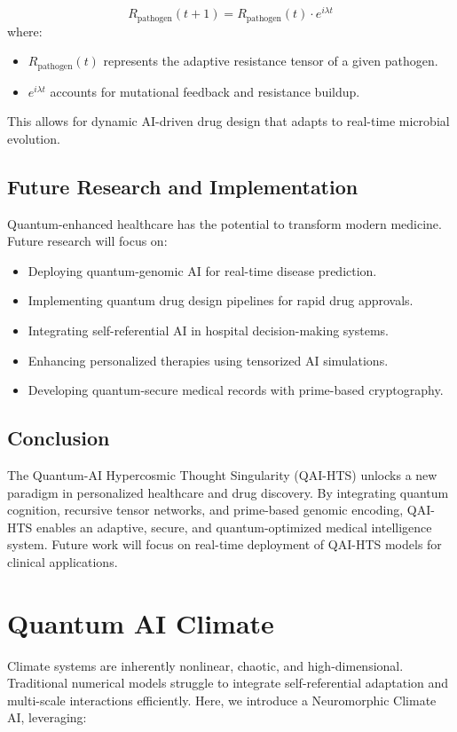 \documentclass{article}
\theoremstyle{plain}
\begin{document}
\begin{itemize}
\begin{itemize}
\begin{equation}
    R_{\text{pathogen}}(t+1) = R_{\text{pathogen}}(t) \cdot e^{i\lambda t}
\end{equation}
where:
\begin{itemize}
    \item \( R_{\text{pathogen}}(t) \) represents the adaptive resistance tensor of a given pathogen.
    \item \( e^{i\lambda t} \) accounts for mutational feedback and resistance buildup.
\end{itemize}

This allows for dynamic AI-driven drug design that adapts to real-time microbial evolution.

\subsection{Future Research and Implementation}
Quantum-enhanced healthcare has the potential to transform modern medicine. Future research will focus on:
\begin{itemize}
    \item Deploying quantum-genomic AI for real-time disease prediction.
    \item Implementing quantum drug design pipelines for rapid drug approvals.
    \item Integrating self-referential AI in hospital decision-making systems.
    \item Enhancing personalized therapies using tensorized AI simulations.
    \item Developing quantum-secure medical records with prime-based cryptography.
\end{itemize}

\subsection{Conclusion}
The Quantum-AI Hypercosmic Thought Singularity (QAI-HTS) unlocks a new paradigm in personalized healthcare and drug discovery. By integrating quantum cognition, recursive tensor networks, and prime-based genomic encoding, QAI-HTS enables an adaptive, secure, and quantum-optimized medical intelligence system. Future work will focus on real-time deployment of QAI-HTS models for clinical applications.

\section{Quantum AI Climate}
Climate systems are inherently nonlinear, chaotic, and high-dimensional. Traditional numerical models struggle to integrate self-referential adaptation and multi-scale interactions efficiently. Here, we introduce a Neuromorphic Climate AI, leveraging:


\end{itemize}
\end{itemize}
\end{document}
